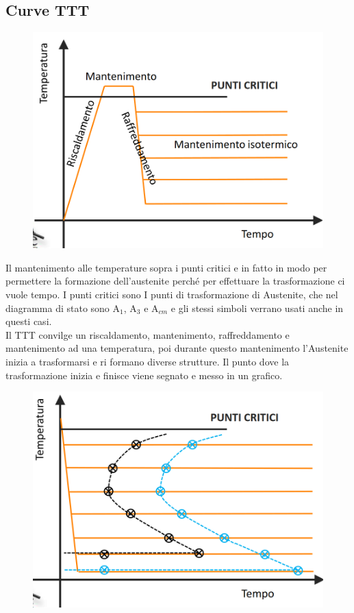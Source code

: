 \documentclass{article}
\begin{document}
{        \subsection{Curve TTT}
            \begin{figure}[h!]
                \centering
                \includegraphics[width=.75\linewidth]{Metallurgia/L15 - Ciclo TTT.png}
            \end{figure}
            Il mantenimento alle temperature sopra i punti critici e in fatto in modo per permettere la formazione dell'austenite perch\'e per effettuare la trasformazione ci vuole tempo. I punti critici sono I punti di trasformazione di Austenite, che nel diagramma di stato sono A$_1$, A$_3$ e A$_{cm}$ e gli stessi simboli verrano usati anche in questi casi.\\
            Il TTT convilge un riscaldamento, mantenimento, raffreddamento e mantenimento ad una temperatura, poi durante questo mantenimento l'Austenite inizia a trasformarsi e ri formano diverse strutture. Il punto dove la trasformazione inizia e finisce viene segnato e messo in un grafico.\\
            \newpage
            \begin{figure}[h!]
                \centering
                \includegraphics[width=.75\linewidth]{Metallurgia/L15 - TTT con cerchi e croci.png}

\end{figure}}
\end{document}
